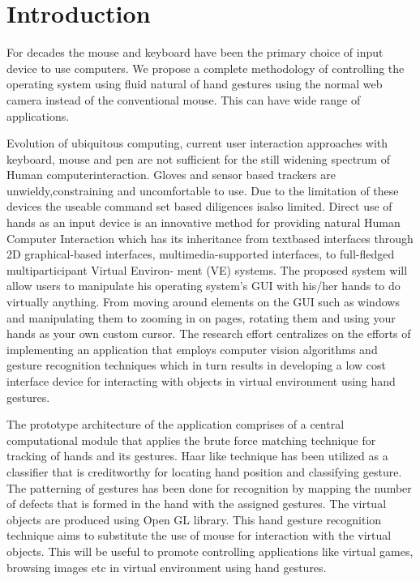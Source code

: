 \documentclass[11pt]{report}
\begin{document}
\tableofcontents

\cleardoublepage

\listoffigures

\cleardoublepage

 
\newpage

\chapter{Introduction}

For decades the mouse and keyboard have been the primary choice of input device to use computers. We propose a complete methodology of controlling the operating system using fluid natural of hand gestures using the normal web camera instead of the conventional mouse. This can have wide range of applications.

Evolution of ubiquitous computing, current user interaction approaches with keyboard, mouse and pen are not sufficient for the still widening spectrum of Human computerinteraction. Gloves and sensor based trackers are unwieldy,constraining and uncomfortable to use. Due to the limitation of these devices the useable command set based diligences isalso limited. Direct use of hands as an input device is an innovative method for providing natural Human Computer Interaction which has its inheritance from textbased interfaces through 2D graphical-based interfaces, multimedia-supported interfaces, to full-fledged multiparticipant Virtual Environ-
ment (VE) systems. The proposed system will allow users to
manipulate his operating system’s GUI with his/her hands to do virtually anything. From moving around elements on the GUI such as windows and manipulating them to zooming in on pages, rotating them and using your hands as your own custom cursor. The research effort centralizes on the efforts of implementing an application that employs computer vision algorithms and gesture recognition techniques which in turn results in developing a low cost interface device for interacting with objects in virtual environment using hand gestures.

The prototype architecture of the application comprises of a central computational module that applies the brute force matching technique for tracking of hands and its gestures. Haar like technique has been utilized as a classifier that is creditworthy for locating hand position and classifying gesture. The patterning of gestures has been done for recognition by mapping the number of defects that is formed in the hand with the assigned gestures. The virtual objects are produced using Open GL library. This hand gesture recognition technique
aims to substitute the use of mouse for interaction with the
virtual objects. This will be useful to promote controlling applications like virtual games, browsing images etc in virtual
environment using hand gestures.
\end{document}
